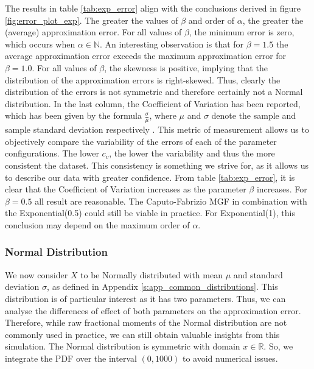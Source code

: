 The results in table \ref{tab:exp_error} align with the conclusions derived in figure \ref{fig:error_plot_exp}. The greater the values of \(\beta\) and order of \(\alpha\), the greater the (average) approximation error. For all values of \(\beta\), the minimum error is zero, which occurs when \(\alpha \in \mathbb{N}\). An interesting observation is that for \(\beta = 1.5\) the average approximation error exceeds the maximum approximation error for \(\beta = 1.0\). For all values of \(\beta\), the skewness is positive, implying that the distribution of the approximation errors is right-skewed. Thus, clearly the distribution of the errors is not symmetric and therefore certainly not a Normal distribution. In the last column, the Coefficient of Variation has been reported, which has been given by the formula \(\displaystyle \frac{\sigma}{\mu}\), where \(\mu\) and \(\sigma\) denote the sample and sample standard deviation respectively \cite{hendricks1936}. This metric of measurement allows us to objectively compare the variability of the errors of each of the parameter configurations. The lower \(c_v\), the lower the variability and thus the more consistent the dataset. This consistency is something we strive for, as it allows us to describe our data with greater confidence. From table \ref{tab:exp_error}, it is clear that the Coefficient of Variation increases as the parameter \(\beta\) increases. For \(\beta = 0.5\) all result are reasonable. The Caputo-Fabrizio MGF in combination with the Exponential(0.5) could still be viable in practice. For Exponential(1), this conclusion may depend on the maximum order of \(\alpha\).

\subsubsection{Normal Distribution}
We now consider \(X\) to be Normally distributed with mean \(\mu\) and standard deviation \(\sigma\), as defined in Appendix \ref{s:app_common_distributions}. This distribution is of particular interest as it has two parameters. Thus, we can analyse the differences of effect of both parameters on the approximation error. Therefore, while raw fractional moments of the Normal distribution are not commonly used in practice, we can still obtain valuable insights from this simulation.  The Normal distribution is symmetric with domain \(x \in \mathbb{R}\). So, we integrate the PDF over the interval \((0, 1000)\) to avoid numerical issues.
\newline

